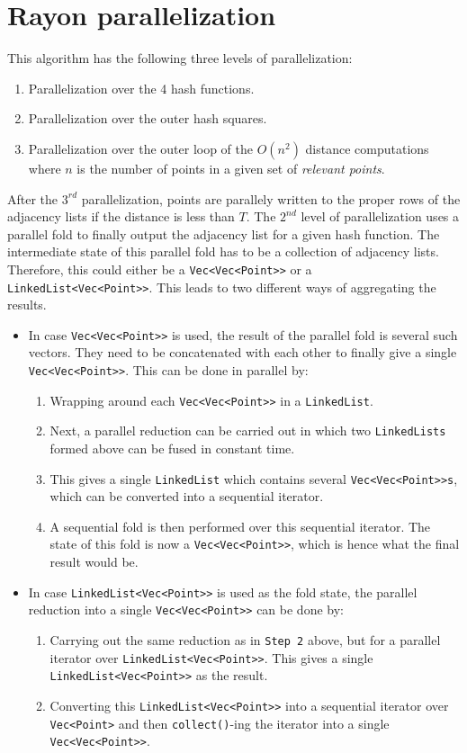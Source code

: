\section{Rayon parallelization}
This algorithm has the following three levels of parallelization:
\begin{enumerate}
\item Parallelization over the 4 hash functions.
\item Parallelization over the outer hash squares.
\item Parallelization over the outer loop of the $O(n^2)$ distance computations where $n$ is the number of points in a given set of \emph{relevant points}.
\end{enumerate}
After the $3^{rd}$ parallelization, points are parallely written to the proper rows of the adjacency lists if the distance is less than $T$.
The $2^{nd}$ level of parallelization uses a parallel fold to finally output the adjacency list for a given hash function.
The intermediate state of this parallel fold has to be a collection of adjacency lists. Therefore, this could either be a \texttt{Vec<Vec<Point>>} or a \texttt{LinkedList<Vec<Point>>}. This leads to two different ways of aggregating the results.
\begin{itemize}
    \item In case \texttt{Vec<Vec<Point>>} is used, the result of the parallel fold is several such vectors. They need to be concatenated with each other to finally give a single \texttt{Vec<Vec<Point>>}. This can be done in parallel by:
        \begin{enumerate}
        \item Wrapping around each \texttt{Vec<Vec<Point>>} in a \texttt{LinkedList}.
        \item Next, a parallel reduction can be carried out in which two \texttt{LinkedLists} formed above can be fused in constant time.
        \item This gives a single \texttt{LinkedList} which contains several \texttt{Vec<Vec<Point>>s}, which can be converted into a sequential iterator.
        \item A sequential fold is then performed over this sequential iterator. The state of this fold is now a \texttt{Vec<Vec<Point>>}, which is hence what the final result would be.
        \end{enumerate}
    \item In case \texttt{LinkedList<Vec<Point>>} is used as the fold state, the parallel reduction into a single \texttt{Vec<Vec<Point>>} can be done by:
        \begin{enumerate}
            \item Carrying out the same reduction as in \texttt{Step 2} above, but for a parallel iterator over \texttt{LinkedList<Vec<Point>>}. This gives a single \texttt{LinkedList<Vec<Point>>} as the result.
            \item Converting this \texttt{LinkedList<Vec<Point>>} into a sequential iterator over \texttt{Vec<Point>} and then \texttt{collect()}-ing the iterator into a single \texttt{Vec<Vec<Point>>}.
        \end{enumerate}
\end{itemize}

